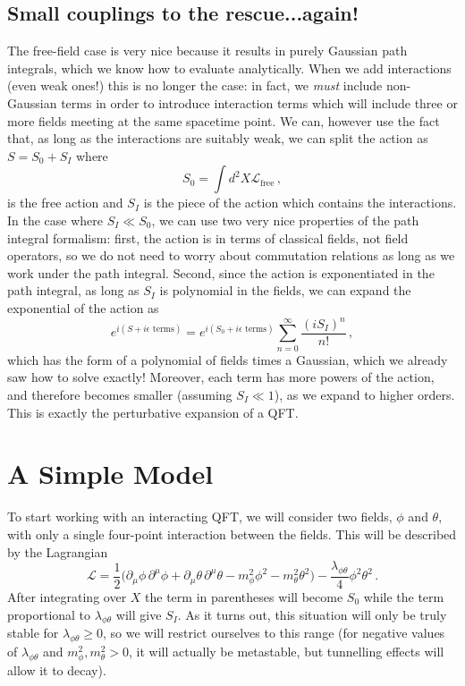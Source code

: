 \documentclass{article}
\numberwithin{equation}{subsection}
\begin{document}
\subsection{Small couplings to the rescue...again!}

The free-field case is very nice because it results in purely Gaussian path integrals, which we know how to evaluate analytically. When we add interactions 
(even weak ones!) this is no longer the case: in fact, we \textit{must} include non-Gaussian terms in order to introduce interaction terms which will include three or more 
fields meeting at the same spacetime point. We can, however use the fact that, as long as the interactions are suitably weak, we can split the action as $S = S_0 + S_I$ where
\begin{equation}
    S_0 = \int d^2X\mathcal{L}_{\text{free}}\,,
\end{equation}
is the free action and $S_I$ is the piece of the action which contains the interactions. In the case where $S_I\ll S_0$, we can use two very nice properties 
of the path integral formalism: first, the action is in terms of classical fields, not field operators, so we do not need to worry about commutation relations as long as we work 
under the path integral. Second, since the action is exponentiated in the path integral, as long as $S_I$ is polynomial in the fields, we can expand the exponential of the action as
\begin{equation}
    e^{i (S + i\epsilon\text{ terms})} = e^{i (S_0 + i\epsilon\text{ terms})}\sum_{n=0}^\infty\frac{(i S_I)^n}{n!}\,,
\end{equation}
which has the form of a polynomial of fields times a Gaussian, which we already saw how to solve exactly! Moreover, each term has more powers of the action, and therefore becomes 
smaller (assuming $S_I \ll 1$), as we expand to higher orders. This is exactly the perturbative expansion of a QFT.

\section{A Simple Model}

To start working with an interacting QFT, we will consider two fields, $\phi$ and $\theta$, with only a single four-point interaction between the fields. This will be described by the Lagrangian
\begin{equation}\label{eq:Lag}
    \mathcal{L} = \frac{1}{2}\Big(\partial_\mu\phi\,\partial^\mu\phi + \partial_\mu\theta\,\partial^\mu\theta - m_\phi^2\phi^2 - m_\theta^2\theta^2\Big) - \frac{\lambda_{\phi\theta}}{4}\phi^2\theta^2\,.
\end{equation}
After integrating over $X$ the term in parentheses will become $S_0$ while the term proportional to $\lambda_{\phi\theta}$ will give $S_I$. As it turns out, 
this situation will only be truly stable for $\lambda_{\phi\theta}\ge 0$, so we will restrict ourselves to this range (for negative values of $\lambda_{\phi\theta}$ 
and $m_\phi^2,m_\theta^2 >0$, it will actually be metastable, but tunnelling effects will allow it to decay).
\end{document}
